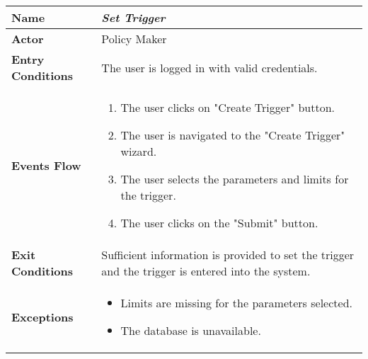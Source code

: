 
\begin{center}
\renewcommand{\arraystretch}{1.25}
\begin{tabular}{|l|>{\raggedright\arraybackslash}m{12cm}|}

    \hline
    \textbf{Name} & \textit{Set Trigger}\\
    \hline
   	\textbf{Actor} & Policy Maker\\
    \hline
    \textbf{Entry Conditions} & The user is logged in with valid credentials.\\
    \hline
    \textbf{Events Flow} & 
    \begin{enumerate}
	    \item The user clicks on "Create Trigger" button.
    	\item The user is navigated to the "Create Trigger" wizard.
    	\item The user selects the parameters and limits for the trigger.
    	\item The user clicks on the "Submit" button.
    \end{enumerate} \\ \hline
    \textbf{Exit Conditions} & Sufficient information is provided to set the trigger and the trigger is entered into the system.\\
    \hline
    \textbf{Exceptions} & \begin{itemize}
    	\item Limits are missing for the parameters selected.
    	\item The database is unavailable.
    \end{itemize}\\
    \hline
\end{tabular}
\end{center}